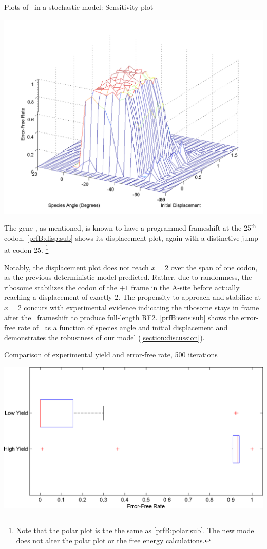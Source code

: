 \documentclass[twocolumn]{article}
\begin{document}
\begin{cfigure}
  \caption{Plots of \prfB\ in a stochastic model: Sensitivity plot}
  \label{prfB:sens:sub}
  \includegraphics[width=\linewidth]{prfB/sensitivity}
\end{cfigure}

The gene \prfB, as mentioned, is known
to have a programmed frameshift at the 25$^{\textrm{th}}$ codon.
\autoref{prfB:disp:sub} shows its displacement plot,
again with a distinctive jump at codon 25.
\footnote{Note that the polar plot is the the same as \autoref{prfB:polar:sub}.
The new model does not alter the polar plot or the free energy calculations.}

Notably, the displacement plot does not reach $x=2$ over the span of
one codon, as the previous deterministic model predicted.  Rather, due to randomness, the
ribosome stabilizes the codon of the $+1$ frame in the A-site before actually reaching
a displacement of exactly 2.  The propensity to approach and stabilize at $x=2$
concurs with experimental evidence indicating the ribosome
stays in frame after the \prfB\ frameshift to produce full-length RF2.
\autoref{prfB:sens:sub} shows the error-free rate of \prfB\ as a function
of species angle and initial displacement and demonstrates the
robustness of our model (\autoref{section:discussion}).

\begin{cfigure}
  \caption{Comparison of experimental yield and error-free rate, 500 iterations}
  \label{weissboxplot}
  \includegraphics[width=\linewidth]{histograms/weissbox}
\end{cfigure}
\end{document}
